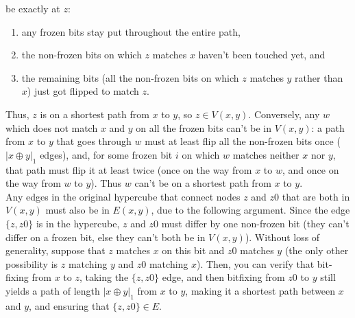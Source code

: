 \documentclass[11pt]{article}
\begin{document}
\begin{enumerate}
\begin{enumerate}
				be exactly at $z$:
				\begin{enumerate}
					\item any frozen bits stay put throughout the entire path,
					\item the non-frozen bits on which $z$ matches $x$ haven’t been touched yet, and
					\item the remaining bits (all the non-frozen bits on which $z$ matches $y$ rather than $x$) just got flipped to match $z$.
				\end{enumerate}
				
				Thus, $z$ is on a shortest path from $x$ to $y$, so $z \in V(x, y).$
				Conversely, any $w$ which does not match $x$ and $y$ on all the frozen bits can’t be in $V(x, y)$: a path from $x$ to $y$ that goes through $w$ must at least flip all the non-frozen bits once ($|x \oplus y|_1$ edges), and, for some frozen bit $i$ on which $w$ matches neither $x$ nor $y$, that path must flip it at least twice
				(once on the way from $x$ to $w$, and once on the way from $w$ to $y$). Thus $w$ can’t be on a shortest path from $x$ to $y$. \\
				Any edges in the original hypercube that connect nodes $z$ and $z0$ that are both in $V(x, y)$ must also be in $E(x, y)$, due to the following argument. Since the edge $\{z,z0\}$ is in the hypercube, $z$ and $z0$ must differ by one non-frozen bit (they can’t differ on a frozen bit, else they can’t both be in $V(x, y)$).
				Without loss of generality, suppose that $z$ matches $x$ on this bit and $z0$ matches $y$ (the
				only other possibility is $z$ matching $y$ and $z0$ matching $x$). Then, you can verify that bit-fixing from $x$ to $z$, taking the $\{z,z0\}$ edge, and then bitfixing from $z0$ to $y$ still yields a path of length $|x \oplus y|_1$ from $x$ to $y$, making it a shortest path between $x$ and $y$, and ensuring that $\{z,z0\} \in E$.
			\end{enumerate}
		
		
	\end{enumerate}
		
\end{document}
